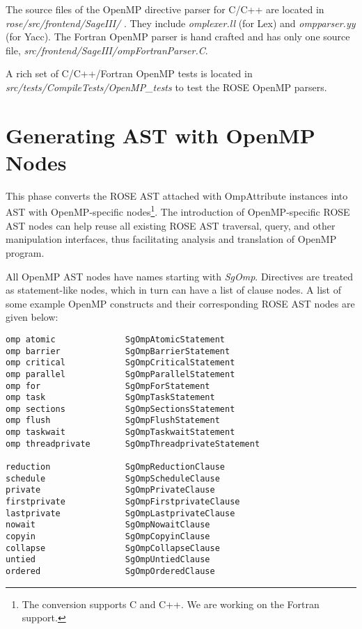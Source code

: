 The source files of the OpenMP directive parser for C/C++ are located in \textit{rose/src/frontend/SageIII/ }.
They include \textit{omplexer.ll} (for Lex) and \textit{ompparser.yy} (for Yacc).
The Fortran OpenMP parser is hand crafted and has only one source file, \textit{src/frontend/SageIII/ompFortranParser.C}. 

A rich set of C/C++/Fortran OpenMP tests is located in \textit{src/tests/CompileTests/OpenMP\_tests} to test the ROSE OpenMP parsers.
\section{Generating AST with OpenMP Nodes}
This phase converts the ROSE AST attached with OmpAttribute instances into
AST with OpenMP-specific nodes\footnote{The conversion supports C and C++.
We are working on the Fortran support.}.
The introduction of OpenMP-specific ROSE AST nodes can help reuse all existing ROSE AST traversal, query, and other manipulation interfaces, thus facilitating analysis and translation of OpenMP program.

All OpenMP AST nodes have names starting with \textit{SgOmp}. 
Directives are treated as statement-like nodes, which in turn can have a list of clause nodes.
A list of some example OpenMP constructs and their corresponding ROSE AST nodes are given below:

{\scriptsize
\begin{verbatim}
omp atomic              SgOmpAtomicStatement
omp barrier             SgOmpBarrierStatement
omp critical            SgOmpCriticalStatement
omp parallel            SgOmpParallelStatement
omp for                 SgOmpForStatement
omp task                SgOmpTaskStatement
omp sections            SgOmpSectionsStatement
omp flush               SgOmpFlushStatement
omp taskwait            SgOmpTaskwaitStatement
omp threadprivate       SgOmpThreadprivateStatement

reduction               SgOmpReductionClause
schedule                SgOmpScheduleClause
private                 SgOmpPrivateClause
firstprivate            SgOmpFirstprivateClause
lastprivate             SgOmpLastprivateClause
nowait                  SgOmpNowaitClause
copyin                  SgOmpCopyinClause
collapse                SgOmpCollapseClause
untied                  SgOmpUntiedClause
ordered                 SgOmpOrderedClause
\end{verbatim}
}
 
